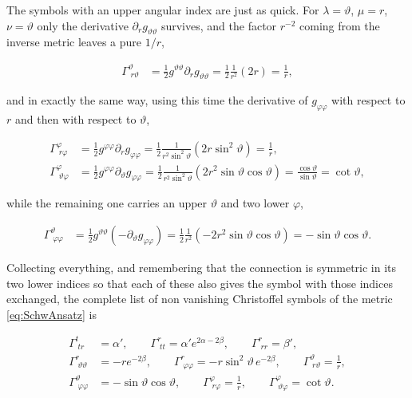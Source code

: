         The symbols with an upper angular index are just as quick. For $\lambda=\vartheta$, $\mu=r$, $\nu=\vartheta$ only the derivative $\partial_rg_{\vartheta\vartheta}$ survives, and the factor $r^{-2}$ coming from the inverse metric leaves a pure $1/r$,

        \begin{align*}
            \Gamma^{\vartheta}_{\;r\vartheta} &= \frac{1}{2}g^{\vartheta\vartheta}\partial_rg_{\vartheta\vartheta} = \frac{1}{2}\frac{1}{r^2}\left(2r\right) = \frac{1}{r},
        \end{align*}

        and in exactly the same way, using this time the derivative of $g_{\varphi\varphi}$ with respect to $r$ and then with respect to $\vartheta$,

        \begin{align*}
            \Gamma^{\varphi}_{\;r\varphi} &= \frac{1}{2}g^{\varphi\varphi}\partial_rg_{\varphi\varphi} = \frac{1}{2}\frac{1}{r^2\sin^2\vartheta}\left(2r\sin^2\vartheta\right) = \frac{1}{r},\\
            \Gamma^{\varphi}_{\;\vartheta\varphi} &= \frac{1}{2}g^{\varphi\varphi}\partial_{\vartheta}g_{\varphi\varphi} = \frac{1}{2}\frac{1}{r^2\sin^2\vartheta}\left(2r^2\sin\vartheta\cos\vartheta\right) = \frac{\cos\vartheta}{\sin\vartheta} = \cot\vartheta,
        \end{align*}

        while the remaining one carries an upper $\vartheta$ and two lower $\varphi$,

        \begin{align*}
            \Gamma^{\vartheta}_{\;\varphi\varphi} &= \frac{1}{2}g^{\vartheta\vartheta}\left(-\partial_{\vartheta}g_{\varphi\varphi}\right) = \frac{1}{2}\frac{1}{r^2}\left(-2r^2\sin\vartheta\cos\vartheta\right) = -\sin\vartheta\cos\vartheta.
        \end{align*}

        Collecting everything, and remembering that the connection is symmetric in its two lower indices so that each of these also gives the symbol with those indices exchanged, the complete list of non vanishing Christoffel symbols of the metric \ref{eq:SchwAnsatz} is

        \begin{align}\label{eq:SchwChristoffels}
            \Gamma^{t}_{\;tr} &= \alpha',\qquad \Gamma^{r}_{\;tt} = \alpha'e^{2\alpha-2\beta},\qquad \Gamma^{r}_{\;rr} = \beta',\nonumber\\
            \Gamma^{r}_{\;\vartheta\vartheta} &= -re^{-2\beta},\qquad \Gamma^{r}_{\;\varphi\varphi} = -r\sin^2\vartheta\,e^{-2\beta},\qquad \Gamma^{\vartheta}_{\;r\vartheta} = \frac{1}{r},\\
            \Gamma^{\vartheta}_{\;\varphi\varphi} &= -\sin\vartheta\cos\vartheta,\qquad \Gamma^{\varphi}_{\;r\varphi} = \frac{1}{r},\qquad \Gamma^{\varphi}_{\;\vartheta\varphi} = \cot\vartheta.\nonumber
        \end{align}

